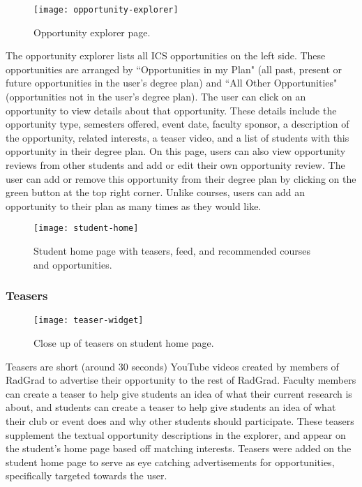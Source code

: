 \begin{figure}[htbp!]
\centering
\texttt{[image: opportunity-explorer]}
\caption{Opportunity explorer page.}
\end{figure}

The opportunity explorer lists all ICS opportunities on the left side. These opportunities are arranged by ``Opportunities in my Plan" (all past, present or future opportunities in the user's degree plan) and ``All Other Opportunities" (opportunities not in the user's degree plan). The user can click on an opportunity to view details about that opportunity. These details include the opportunity type, semesters offered, event date, faculty sponsor, a description of the opportunity, related interests, a teaser video, and a list of students with this opportunity in their degree plan. On this page, users can also view opportunity reviews from other students and add or edit their own opportunity review. The user can add or remove this opportunity from their degree plan by clicking on the green button at the top right corner. Unlike courses, users can add an opportunity to their plan as many times as they would like.

\begin{figure}[htbp!]
\centering
\texttt{[image: student-home]}
\caption{Student home page with teasers, feed, and recommended courses and opportunities.}
\end{figure}

\subsubsection{Teasers}
\begin{figure}[htbp!]
\centering
\texttt{[image: teaser-widget]}
\caption{Close up of teasers on student home page.}
\end{figure}
Teasers are short (around 30 seconds) YouTube videos created by members of RadGrad to advertise their opportunity to the rest of RadGrad. Faculty members can create a teaser to help give students an idea of what their current research is about, and students can create a teaser to help give students an idea of what their club or event does and why other students should participate. These teasers supplement the textual opportunity descriptions in the explorer, and appear on the student's home page based off matching interests. Teasers were added on the student home page to serve as eye catching advertisements for opportunities, specifically targeted towards the user.

